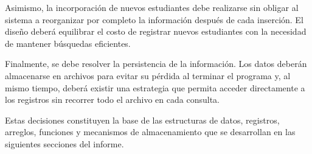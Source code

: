 Asimismo, la incorporación de nuevos estudiantes debe realizarse sin
obligar al sistema a reorganizar por completo la información después de
cada inserción. El diseño deberá equilibrar el costo de registrar nuevos
estudiantes con la necesidad de mantener búsquedas eficientes.

Finalmente, se debe resolver la persistencia de la información. Los
datos deberán almacenarse en archivos para evitar su pérdida al terminar
el programa y, al mismo tiempo, deberá existir una estrategia que permita
acceder directamente a los registros sin recorrer todo el archivo en
cada consulta.

Estas decisiones constituyen la base de las estructuras de datos,
registros, arreglos, funciones y mecanismos de almacenamiento que se
desarrollan en las siguientes secciones del informe.
